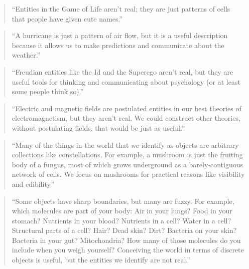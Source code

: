 \documentclass[12pt]{book}
\theoremstyle{exercise}
\begin{document}
\begin{quote}
``Entities in the Game of Life aren't real; they are just patterns of
  cells that people have given cute names.''
\end{quote}

\begin{quote}
``A hurricane is just a pattern of air flow, but it is a useful
  description because it allows us to make predictions and communicate
  about the weather.''
\end{quote}


\begin{quote}
``Freudian entities like the Id and the Superego aren't real, but they
  are useful tools for thinking and communicating about psychology (or
  at least some people think so).''
\end{quote}


\begin{quote}
``Electric and magnetic fields are postulated entities in our best
  theories of electromagnetism, but they aren't real.  We could
  construct other theories, without postulating fields, that would be
  just as useful.''
\end{quote}


\begin{quote}
``Many of the things in the world that we identify as objects are
  arbitrary collections like constellations.  For example, a mushroom
  is just the fruiting body of a fungus, most of which grows
  underground as a barely-contiguous network of cells.  We focus
  on mushrooms for practical reasons like visibility and edibility.''
\end{quote}


\begin{quote}
``Some objects have sharp boundaries, but many are fuzzy.  For
  example, which molecules are part of your body: Air in your lungs?
  Food in your stomach?  Nutrients in your blood?  Nutrients in a
  cell?  Water in a cell?  Structural parts of a cell?  Hair?  Dead
  skin?  Dirt?  Bacteria on your skin?  Bacteria in your gut?
  Mitochondria?  How many of those molecules do you include when you
  weigh yourself?  Conceiving the world in terms of discrete objects
  is useful, but the entities we identify are not real.''
\end{quote}
\end{document}
